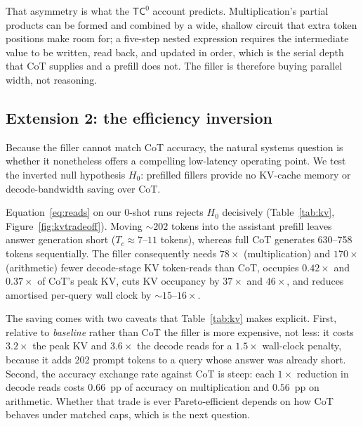 \documentclass[11pt,a4paper]{article}
\begin{document}
That asymmetry is what the $\mathsf{TC}^0$ account predicts. Multiplication's
partial products can be formed and combined by a wide, shallow circuit that extra
token positions make room for; a five-step nested expression requires the
intermediate value to be written, read back, and updated in order, which is the
serial depth that CoT supplies and a prefill does not. The filler is therefore
buying parallel width, not reasoning.

\subsection{Extension 2: the efficiency inversion}
\label{sec:kv}

Because the filler cannot match CoT accuracy, the natural systems question is
whether it nonetheless offers a compelling low-latency operating point. We test
the inverted null hypothesis $H_0$: prefilled fillers provide no KV-cache memory
or decode-bandwidth saving over CoT.

Equation~\eqref{eq:reads} on our 0-shot runs rejects $H_0$ decisively
(Table~\ref{tab:kv}, Figure~\ref{fig:kvtradeoff}). Moving ${\sim}202$ tokens into
the assistant prefill leaves answer generation short ($T_c\approx7$--$11$ tokens),
whereas full CoT generates 630--758 tokens sequentially. The filler consequently
needs $78\times$ (multiplication) and $170\times$ (arithmetic) fewer decode-stage
KV token-reads than CoT, occupies $0.42\times$ and $0.37\times$ of CoT's peak KV,
cuts KV occupancy by $37\times$ and $46\times$, and reduces amortised per-query
wall clock by ${\sim}15$--$16\times$.

The saving comes with two caveats that Table~\ref{tab:kv} makes explicit. First,
relative to \emph{baseline} rather than CoT the filler is more expensive, not
less: it costs $3.2\times$ the peak KV and $3.6\times$ the decode reads for a
$1.5\times$ wall-clock penalty, because it adds 202 prompt tokens to a query whose
answer was already short. Second, the accuracy exchange rate against CoT is steep:
each $1\times$ reduction in decode reads costs $0.66$~pp of accuracy on
multiplication and $0.56$~pp on arithmetic. Whether that trade is ever
Pareto-efficient depends on how CoT behaves under matched caps, which is the next
question.
\end{document}
